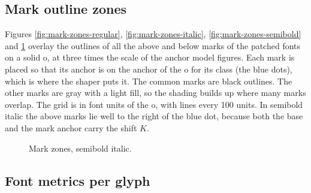 \documentclass[landscape]{article}
\begin{document}

\clearpage
\subsection*{Mark outline zones}

Figures \ref{fig:mark-zones-regular}, \ref{fig:mark-zones-italic}, \ref{fig:mark-zones-semibold} and \ref{fig:mark-zones-semibold-italic}
overlay the outlines of all the above and below marks of the patched fonts on a solid o, at three times the scale of the anchor model figures.
Each mark is placed so that its anchor is on the anchor of the o for its class (the blue dots), which is where the shaper puts it.
The common marks are black outlines. The other marks are gray with a light fill, so the shading builds up where many marks overlap.
The grid is in font units of the o, with lines every 100 units.
In semibold italic the above marks lie well to the right of the blue dot, because both the base and the mark anchor carry the shift $K$.

\begin{figure}[htbp]
	\captionsetup{justification=raggedright, singlelinecheck=false}
	\begin{minipage}[t]{0.245\textwidth}
		
		\caption{Mark zones, regular.}
		\label{fig:mark-zones-regular}
	\end{minipage}\hfill
	\begin{minipage}[t]{0.245\textwidth}
		
		\caption{Mark zones, italic.}
		\label{fig:mark-zones-italic}
	\end{minipage}\hfill
	\begin{minipage}[t]{0.245\textwidth}
		
		\caption{Mark zones, semibold.}
		\label{fig:mark-zones-semibold}
	\end{minipage}\hfill
	\begin{minipage}[t]{0.245\textwidth}
		
		\caption{Mark zones, semibold italic.}
		\label{fig:mark-zones-semibold-italic}
	\end{minipage}
\end{figure}

\clearpage
\subsection*{Font metrics per glyph}
\end{document}
